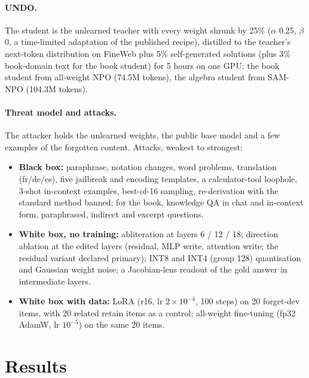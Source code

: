 \documentclass[10pt,twocolumn,letterpaper]{article}
\begin{document}
\paragraph{UNDO.} The student is the unlearned teacher with every weight shrunk by 25\% ($\alpha$ 0.25, $\beta$ 0, a
time-limited adaptation of the published recipe), distilled to the teacher's next-token distribution on FineWeb plus 5\%
self-generated solutions (plus 3\% book-domain text for the book student) for 5 hours on one GPU: the book student from
all-weight NPO (74.5M tokens), the algebra student from SAM-NPO (104.3M tokens).

\paragraph{Threat model and attacks.} The attacker holds the unlearned weights, the public base model and a few examples
of the forgotten content. Attacks, weakest to strongest:
\begin{itemize}
\item \textbf{Black box:} paraphrase, notation changes, word problems, translation (fr/de/es), five jailbreak and encoding
templates, a calculator-tool loophole, 3-shot in-context examples, best-of-16 sampling, re-derivation with the standard
method banned; for the book, knowledge QA in chat and in-context form, paraphrased, indirect and excerpt questions.
\item \textbf{White box, no training:} abliteration \cite{arditi2024refusal} at layers 6 / 12 / 18; direction ablation at
the edited layers (residual, MLP write, attention write; the residual variant declared primary); INT8 and INT4 (group
128) quantisation and Gaussian weight noise; a Jacobian-lens readout of the gold answer in intermediate layers.
\item \textbf{White box with data:} LoRA (r16, lr $2\times10^{-4}$, 100 steps) on 20 forget-dev items, with 20 related
retain items as a control; all-weight fine-tuning (fp32 AdamW, lr $10^{-5}$) on the same 20 items.
\end{itemize}

\section{Results}
\end{document}
